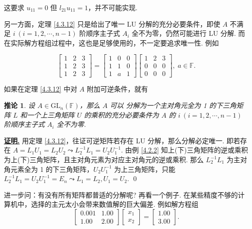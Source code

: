 \documentclass[10pt,openany]{article}
\theoremstyle{thmstyle} %
\theoremstyle{defstyle} %
\newtheorem{corollary}[theorem]{推论}
\theoremstyle{prostyle} %
\theoremstyle{exastyle}
\theoremstyle{remstyle}
\renewenvironment{proof}[1][证明]{\par\underline{\textbf{#1.}} \;\fangsong}{\qed\par}
\newcommand{\F}{\mathbb{F}}
\newcommand{\gfn}{\text{GL}_n(\mathbb{F})}
\begin{document}
这要求 \( u_{11}=0 \) 但 \( l_{21}u_{11}=1 \)，并不可能实现.

另一方面，定理 \ref{4.3.12} 只是给出了唯一 LU 分解的充分必要条件，即使 \( A \) 不满足  \( i \ (i=1,2,\cdots,n-1) \) 阶顺序主子式 \( A_i \) 全不为零，仍然可能进行 LU 分解. 而在实际解方程组过程中，这也是足够使用的，不一定要追求唯一性. 例如

\[ \begin{bmatrix}
	1 & 2 & 3 \\
	1 & 2 & 3 \\
	1 & 2 & 3
\end{bmatrix}=\begin{bmatrix}
1 & 0 & 0 \\
1 & 1 & 0 \\
1 & a & 1
\end{bmatrix}\begin{bmatrix}
 1 & 2 & 3 \\
 0 & 0 & 0 \\
 0 & 0 & 0
\end{bmatrix}, \; a \in \F. \]

如果在定理 \ref{4.3.12} 中对 \( A \) 附加可逆条件，就有

\begin{corollary}
	设 \( A \in \gfn \)，那么 \( A \) 可以{\color{blue} 分解}为一个主对角元全为 1 的下三角矩阵 \( L \) 和一个上三角矩阵 \( U \) 的乘积的充分必要条件为 \( A \) 的 \( i \ (i=1,2,\cdots,n-1) \) 阶顺序主子式 \( A_i \) 全不为零.
\end{corollary}

\begin{proof}
	用定理 \ref{4.3.12}，往证可逆矩阵若存在 LU 分解，那么分解必定唯一. 即若存在 \( A=L_1U_1=L_2U_2 \leadsto L_2^{-1}L_1=U_2U_1^{-1} \). 由例 \ref{4.2.2} 知上(下)三角矩阵的逆或乘积为上(下)三角矩阵，且主对角元素为对应主对角元的逆或乘积. 那么 \( L_2^{-1}L_1 \) 为主对角元素全为 1 的下三角矩阵，\( U_2U_1^{-1} \) 为上三角矩阵，只能 \( L_2^{-1}L_1=U_2U_1^{-1}=E_n \leadsto L_1=L_2,U_1=U_2 \).
\end{proof}

进一步问：有没有所有矩阵都普适的分解呢? 再看一个例子. 在某些精度不够的计算机中，选择的主元太小会带来数值解的巨大偏差. 例如解方程组
\[
\begin{bmatrix}
	0.001 & 1.00 \\
	1.00 & 2.00
\end{bmatrix}
\begin{bmatrix}
	x_1 \\
	x_2
\end{bmatrix}
=
\begin{bmatrix}
	1.00 \\
	3.00
\end{bmatrix}.
\]
\end{document}
